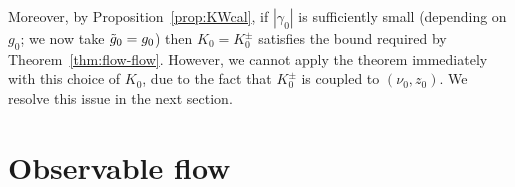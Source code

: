Moreover,
by Proposition~\ref{prop:KWcal}, if
$|\gamma_0|$ is sufficiently small (depending on $g_0$; we now take $\tilde{g}_0=g_0$)
then $K_0 = K^\pm_0$ satisfies the bound required by Theorem~\ref{thm:flow-flow}.
However, we cannot apply the theorem immediately with this choice
of $K_0$,
due to the fact that $K^\pm_0$ is coupled to $(\nu_0, z_0)$.
We resolve this issue in the next section.


\section{Observable flow}

